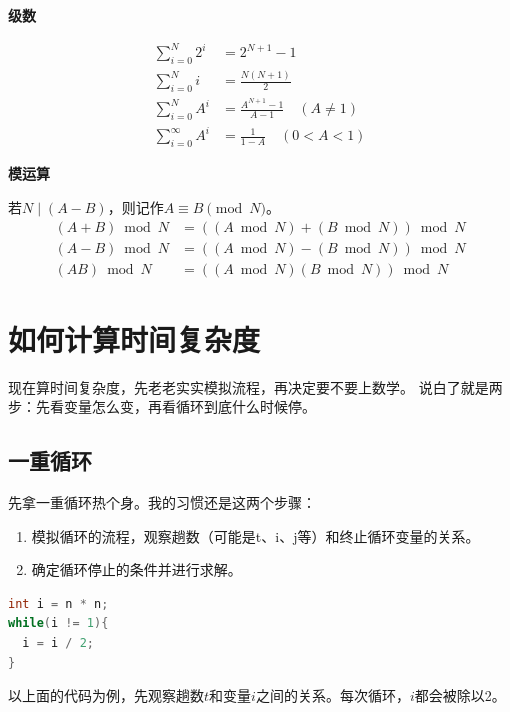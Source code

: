 \documentclass[b5paper,11pt]{article}
\begin{document}
\vspace{0.2em}

\noindent
\begin{minipage}[t]{0.485\textwidth}
  \vspace{0pt}
  {\bfseries\color{ctp-blue}级数}\par
  \[
    \begin{aligned}
      \sum_{i=0}^{N} 2^i &= 2^{N+1} - 1 \\
      \sum_{i=0}^{N} i &= \frac{N(N+1)}{2} \\
      \sum_{i=0}^{N} A^i &= \frac{A^{N+1} - 1}{A - 1} \quad (A \neq 1) \\
      \sum_{i=0}^{\infty} A^i &= \frac{1}{1 - A} \quad (0 < A < 1)
    \end{aligned}
  \]
\end{minipage}
\hfill
\begin{minipage}[t]{0.485\textwidth}
  \vspace{0pt}
  {\bfseries\color{ctp-blue}模运算}\par
  若$N \mid (A-B)$，则记作$A \equiv B \pmod{N}$。
  \[
    \begin{aligned}
      (A + B) \bmod N &= ((A \bmod N) + (B \bmod N)) \bmod N \\
      (A - B) \bmod N &= ((A \bmod N) - (B \bmod N)) \bmod N \\
      (AB) \bmod N &= ((A \bmod N)(B \bmod N)) \bmod N
    \end{aligned}
  \]
\end{minipage}
\endgroup

\section{如何计算时间复杂度}
现在算时间复杂度，先老老实实模拟流程，再决定要不要上数学。
说白了就是两步：先看变量怎么变，再看循环到底什么时候停。
\subsection{一重循环}
先拿一重循环热个身。我的习惯还是这两个步骤：
\begin{enumerate}
  \item 模拟循环的流程，观察趟数（可能是t、i、j等）和终止循环变量的关系。
  \item 确定循环停止的条件并进行求解。
\end{enumerate}

\begin{lstlisting}[language=C]
int i = n * n;
while(i != 1){
  i = i / 2;
}
\end{lstlisting}
以上面的代码为例，先观察趟数$t$和变量$i$之间的关系。每次循环，$i$都会被除以2。
\end{document}
